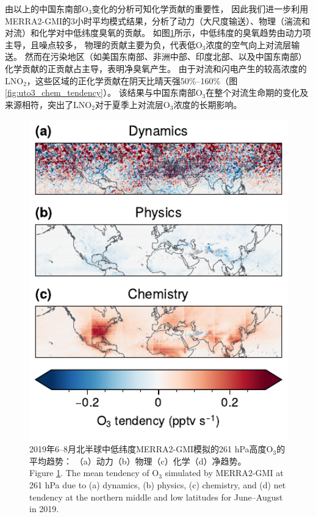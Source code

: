 由以上的中国东南部O$_3$变化的分析可知化学贡献的重要性，
因此我们进一步利用MERRA2-GMI的3小时平均模式结果，分析了动力（大尺度输送）、物理（湍流和对流）和化学对中低纬度臭氧的贡献。
如图\ref{fig:uto3_tendency}所示，中低纬度的臭氧趋势由动力项主导，且噪点较多，
物理的贡献主要为负，代表低O$_3$浓度的空气向上对流层输送。
然而在污染地区（如美国东南部、非洲中部、印度北部、以及中国东南部）化学贡献的正贡献占主导，表明净臭氧产生。
由于对流和闪电产生的较高浓度的LNO$_2$，这些区域的正化学贡献在阴天比晴天强50\%--160\%（图\ref{fig:uto3_chem_tendency}）。
该结果与中国东南部O$_3$在整个对流生命期的变化及来源相符，突出了LNO$_2$对于夏季上对流层O$_3$浓度的长期影响。

\begin{figure}[!htbp]
    \centering
    \includegraphics[width=15cm]{./figures/uto3_tendency.pdf}
    \caption{
    2019年6--8月北半球中低纬度MERRA2-GMI模拟的261 hPa高度O$_3$的平均趋势：
    （a）动力（b）物理（c）化学（d）净趋势。\\
    Figure \ref{fig:uto3_tendency}. The mean tendency of O$_3$ simulated by MERRA2-GMI at 261 hPa due to (a) dynamics, (b) physics, (c) chemistry, and (d) net tendency at the northern middle and low latitudes for June--August in 2019.
    }
    \label{fig:uto3_tendency}
\end{figure}


